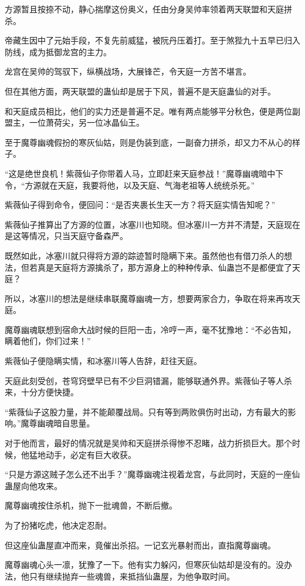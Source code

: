 \begin{this_body}
方源暂且按捺不动，静心揣摩这份奥义，任由分身吴帅率领着两天联盟和天庭拼杀。

帝藏生因中了元始手段，不复先前威猛，被阮丹压着打。至于煞狴九十五早已归入防线，成为抵御龙宫的主力。

龙宫在吴帅的驾驭下，纵横战场，大展锋芒，令天庭一方苦不堪言。

但在其他方面，两天联盟的蛊仙却是居于下风，普遍不是天庭蛊仙的对手。

和天庭成员相比，他们的实力还是普遍不足。唯有两点能够平分秋色，便是两位副盟主，一位萧荷尖，另一位冰晶仙王。

至于魔尊幽魂假扮的寒灰仙姑，则是伪装到底，一副奋力拼杀，却又力不从心的样子。

“这是绝世良机！紫薇仙子你带着人马，立即赶来天庭参战！”魔尊幽魂暗中下令，“方源就在天庭，我要将他，以及天庭、气海老祖等人统统杀死。”

紫薇仙子得到命令，便回问：“是否夹裹长生天一方？将天庭实情告知呢？”

紫薇仙子推算出了方源的位置，冰塞川也知晓。但冰塞川一方并不清楚，天庭现在是这等情况，只当天庭守备森严。

既然如此，冰塞川就只得将方源的踪迹暂时隐瞒下来。虽然他也有借刀杀人的想法，但若真是天庭将方源擒杀了，那方源身上的种种传承、仙蛊岂不是都便宜了天庭？

所以，冰塞川的想法是继续串联魔尊幽魂一方，想要两家合力，争取在将来再攻天庭。

魔尊幽魂联想到宿命大战时候的巨阳一击，冷哼一声，毫不犹豫地：“不必告知，瞒着他们，你们过来！”

紫薇仙子便隐瞒实情，和冰塞川等人告辞，赶往天庭。

天庭此刻受创，苍穹窍壁早已有不少巨洞错漏，能够联通外界。紫薇仙子等人杀来，十分方便快捷。

“紫薇仙子这股力量，并不能颠覆战局。只有等到两败俱伤时出动，方有最大的影响。”魔尊幽魂暗自思量。

对于他而言，最好的情况就是吴帅和天庭拼杀得惨不忍睹，战力折损巨大。那个时候，他猛地动手，必定有巨大收获。

“只是方源这贼子怎么还不出手？”魔尊幽魂注视着龙宫，与此同时，天庭的一座仙蛊屋向他攻来。

魔尊幽魂按住杀机，抛下一批魂兽，不断后撤。

为了扮猪吃虎，他决定忍耐。

但这座仙蛊屋直冲而来，竟催出杀招。一记玄光暴射而出，直指魔尊幽魂。

魔尊幽魂心头一凛，犹豫了一下。他有实力躲闪，但寒灰仙姑却是没有的。没办法，他只有继续抛弃一些魂兽，来抵挡仙蛊屋，为他争取时间。


\end{this_body}
